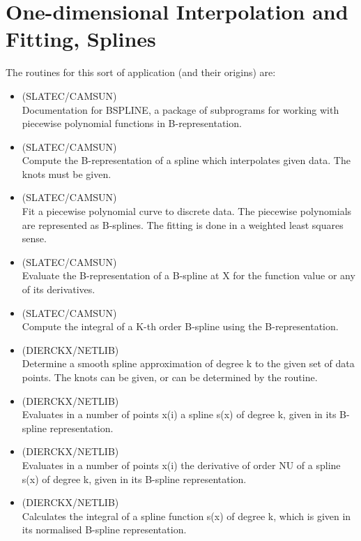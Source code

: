 
\section{One-dimensional
Interpolation and Fitting, Splines}

   The routines for this sort of application (and their origins) are:

\begin{itemize}

\item {} (SLATEC/CAMSUN)\ \\
   Documentation for BSPLINE, a package of subprograms for working
   with piecewise polynomial functions in B-representation.
\item {} (SLATEC/CAMSUN)\ \\
   Compute the B-representation of a spline which interpolates given
   data. The knots must be given.
\item {} (SLATEC/CAMSUN)\ \\
   Fit a piecewise polynomial curve to discrete data. The piecewise
   polynomials are represented as B-splines. The fitting is done in a
   weighted least squares sense.
\item {} (SLATEC/CAMSUN)\ \\
   Evaluate the B-representation of a B-spline at X for the function
   value or any of its derivatives.
\item {} (SLATEC/CAMSUN)\ \\
   Compute the integral of a K-th order B-spline using the
   B-representation.

\item {} (DIERCKX/NETLIB)\ \\
   Determine a smooth spline approximation of degree k to the given
   set of data points. The knots can be given, or can be determined
   by the routine.
\item {} (DIERCKX/NETLIB)\ \\
   Evaluates in a number of points x(i) a spline s(x) of degree k,
   given in its B-spline representation.
\item {} (DIERCKX/NETLIB)\ \\
   Evaluates in a number of points x(i) the derivative of order NU of
   a spline s(x) of degree k, given in its B-spline representation.
\item {} (DIERCKX/NETLIB)\ \\
   Calculates the integral of a spline function s(x) of degree k,
   which is given in its normalised B-spline representation.


\end{itemize}
